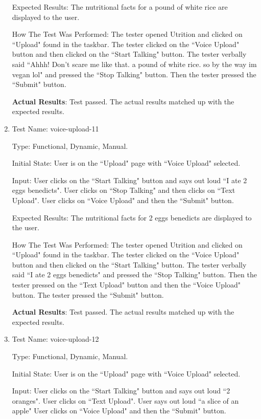 \documentclass[12pt, titlepage]{article}
\begin{document}
\begin{enumerate}
		Expected Results: The nutritional facts for a pound of white rice are displayed to the user.
		
		How The Test Was Performed: The tester opened Utrition and clicked on ``Upload" found in the taskbar. The tester clicked on the ``Voice Upload" button and then clicked on the ``Start Talking" button. The tester verbally said ``Ahhh! Don't scare me like that. a pound of white rice. so by the way im vegan lol" and pressed the ``Stop Talking" button. Then the tester pressed the ``Submit" button.
		
		\textbf{Actual Results}: Test passed. The actual results matched up with the expected results.
	
		\item{Test Name: voice-upload-11}
		
		Type: Functional, Dynamic, Manual.
		
		Initial State: User is on the ``Upload" page with ``Voice Upload" selected.
		
		Input: User clicks on the ``Start Talking" button and says out loud ``I ate 2 eggs benedicts". User clicks on ``Stop Talking" and then clicks on ``Text Upload". User clicks on ``Voice Upload" and then the ``Submit" button.
		
		Expected Results: The nutritional facts for 2 eggs benedicts are displayed to the user.
		
		How The Test Was Performed: The tester opened Utrition and clicked on ``Upload" found in the taskbar. The tester clicked on the ``Voice Upload" button and then clicked on the ``Start Talking" button. The tester verbally said ``I ate 2 eggs benedicts" and pressed the ``Stop Talking" button. Then the tester pressed on the ``Text Upload" button and then the ``Voice Upload" button. The tester pressed the ``Submit" button.
		
		\textbf{Actual Results}: Test passed. The actual results matched up with the expected results.
		
		\item{Test Name: voice-upload-12}
		
		Type: Functional, Dynamic, Manual.
		
		Initial State: User is on the ``Upload" page with ``Voice Upload" selected.
		
		Input: User clicks on the ``Start Talking" button and says out loud ``2 oranges". User clicks on ``Text Upload". User says out loud ``a slice of an apple" User clicks on ``Voice Upload" and then the ``Submit" button.
		

\end{enumerate}
\end{document}
